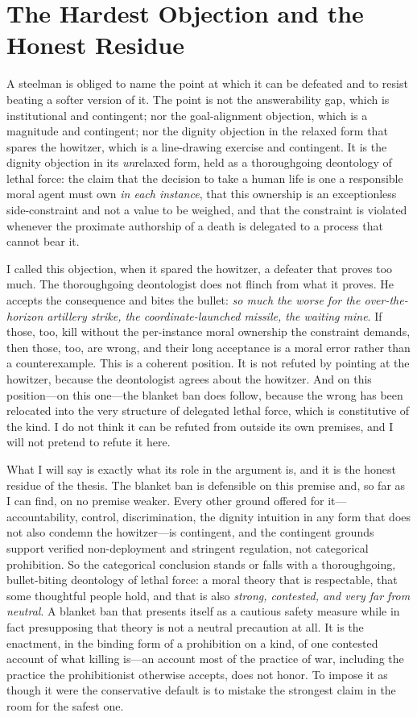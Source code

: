 \documentclass[11pt]{article}
\begin{document}
\section{The Hardest Objection and the Honest Residue}
\label{sec:residue}

A steelman is obliged to name the point at which it can be defeated and to resist beating a softer version of it. The point is not the answerability gap, which is institutional and contingent; nor the goal-alignment objection, which is a magnitude and contingent; nor the dignity objection in the relaxed form that spares the howitzer, which is a line-drawing exercise and contingent. It is the dignity objection in its \emph{un}relaxed form, held as a thoroughgoing deontology of lethal force: the claim that the decision to take a human life is one a responsible moral agent must own \emph{in each instance}, that this ownership is an exceptionless side-constraint and not a value to be weighed, and that the constraint is violated whenever the proximate authorship of a death is delegated to a process that cannot bear it.

I called this objection, when it spared the howitzer, a defeater that proves too much. The thoroughgoing deontologist does not flinch from what it proves. He accepts the consequence and bites the bullet: \emph{so much the worse for the over-the-horizon artillery strike, the coordinate-launched missile, the waiting mine}. If those, too, kill without the per-instance moral ownership the constraint demands, then those, too, are wrong, and their long acceptance is a moral error rather than a counterexample. This is a coherent position. It is not refuted by pointing at the howitzer, because the deontologist agrees about the howitzer. And on this position---on this one---the blanket ban does follow, because the wrong has been relocated into the very structure of delegated lethal force, which is constitutive of the kind. I do not think it can be refuted from outside its own premises, and I will not pretend to refute it here.

What I will say is exactly what its role in the argument is, and it is the honest residue of the thesis. The blanket ban is defensible on this premise and, so far as I can find, on no premise weaker. Every other ground offered for it---accountability, control, discrimination, the dignity intuition in any form that does not also condemn the howitzer---is contingent, and the contingent grounds support verified non-deployment and stringent regulation, not categorical prohibition. So the categorical conclusion stands or falls with a thoroughgoing, bullet-biting deontology of lethal force: a moral theory that is respectable, that some thoughtful people hold, and that is also \emph{strong, contested, and very far from neutral}. A blanket ban that presents itself as a cautious safety measure while in fact presupposing that theory is not a neutral precaution at all. It is the enactment, in the binding form of a prohibition on a kind, of one contested account of what killing is---an account most of the practice of war, including the practice the prohibitionist otherwise accepts, does not honor. To impose it as though it were the conservative default is to mistake the strongest claim in the room for the safest one.
\end{document}
